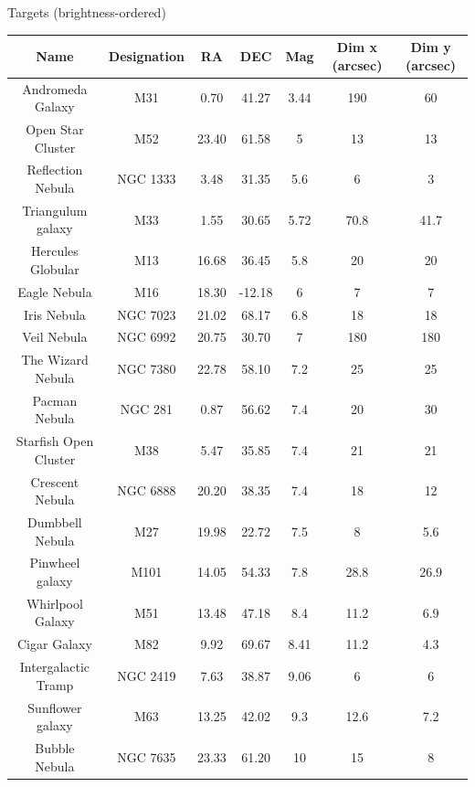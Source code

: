 \documentclass[11pt, aspectratio=169]{beamer}
\begin{document}
\begin{frame}[t]{Targets (brightness-ordered)}
    \begin{table}[]
        \tiny
        \begin{tabular}{|c|c|c|c|c|c|c|}
            \hline
            \textbf{Name}                  & \textbf{Designation} & \textbf{RA}    & \textbf{DEC}    & \textbf{Mag}  & \textbf{Dim x (arcsec)} & \textbf{Dim y (arcsec)} \\ \hline
            Andromeda Galaxy      & M31         & 0.70  & 41.27  & 3.44 & 190   & 60    \\ \hline
            Open Star Cluster     & M52         & 23.40 & 61.58  & 5    & 13    & 13    \\ \hline
            Reflection Nebula     & NGC 1333    & 3.48  & 31.35  & 5.6  & 6     & 3     \\ \hline
            Triangulum galaxy     & M33         & 1.55  & 30.65  & 5.72 & 70.8  & 41.7  \\ \hline
            Hercules Globular     & M13         & 16.68 & 36.45  & 5.8  & 20    & 20    \\ \hline
            Eagle Nebula          & M16         & 18.30 & -12.18 & 6    & 7     & 7     \\ \hline
            Iris Nebula           & NGC 7023    & 21.02 & 68.17  & 6.8  & 18    & 18    \\ \hline
            Veil Nebula           & NGC 6992    & 20.75 & 30.70  & 7    & 180   & 180   \\ \hline
            The Wizard Nebula     & NGC 7380    & 22.78 & 58.10  & 7.2  & 25    & 25    \\ \hline
            Pacman Nebula         & NGC 281     & 0.87  & 56.62  & 7.4  & 20    & 30    \\ \hline
            Starfish Open Cluster & M38         & 5.47  & 35.85  & 7.4  & 21    & 21    \\ \hline
            Crescent Nebula       & NGC 6888    & 20.20 & 38.35  & 7.4  & 18    & 12    \\ \hline
            Dumbbell Nebula       & M27         & 19.98 & 22.72  & 7.5  & 8     & 5.6   \\ \hline
            Pinwheel galaxy       & M101        & 14.05 & 54.33  & 7.8  & 28.8  & 26.9  \\ \hline
            Whirlpool Galaxy      & M51         & 13.48 & 47.18  & 8.4  & 11.2  & 6.9   \\ \hline
            Cigar Galaxy          & M82         & 9.92  & 69.67  & 8.41 & 11.2  & 4.3   \\ \hline
            Intergalactic Tramp   & NGC 2419    & 7.63  & 38.87  & 9.06 & 6     & 6     \\ \hline
            Sunflower galaxy      & M63         & 13.25 & 42.02  & 9.3  & 12.6  & 7.2   \\ \hline
            Bubble Nebula         & NGC 7635    & 23.33 & 61.20  & 10   & 15    & 8     \\ \hline
        \end{tabular}
    \end{table}
\end{frame}
\end{document}
